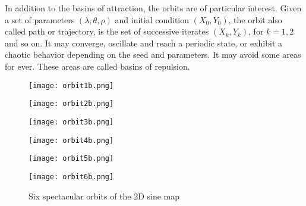 \documentclass[oneside,10pt]{book}
\begin{document}
In addition to the basins of attraction, the \textcolor{index}{orbits} are of particular interest. 
 Given a set of parameters $(\lambda,\theta,\rho)$ and initial condition $(X_0, Y_0)$, the orbit also called path or trajectory,
 is the set of successive iterates $(X_k,Y_k)$, for $k=1,2$ and so on. It may converge, oscillate and reach a periodic state, or exhibit a chaotic behavior depending on the seed and parameters. It may avoid some areas for ever. These
 areas are called \textcolor{index}{basins of repulsion}. 





\begin{figure}[H]
\centering
\begin{minipage}{.5\textwidth}
  \centering
  \texttt{[image: orbit1b.png]}
\end{minipage}%
\begin{minipage}{.5\textwidth}
  \centering
  \texttt{[image: orbit2b.png]}
\end{minipage}
\end{figure}

\begin{figure}[H]
\centering
\begin{minipage}{.5\textwidth}
  \centering
  \texttt{[image: orbit3b.png]}
\end{minipage}%
\begin{minipage}{.5\textwidth}
  \centering
  \texttt{[image: orbit4b.png]}
\end{minipage}
\end{figure}

\begin{figure}[H]
\centering
\begin{minipage}{.5\textwidth}
  \centering
  \texttt{[image: orbit5b.png]}
\end{minipage}%
\begin{minipage}{.5\textwidth}
  \centering
  \texttt{[image: orbit6b.png]}
\end{minipage}
\caption{Six spectacular orbits of the 2D sine map}
\label{fig:b6b4c9u6}
\end{figure}
\end{document}

